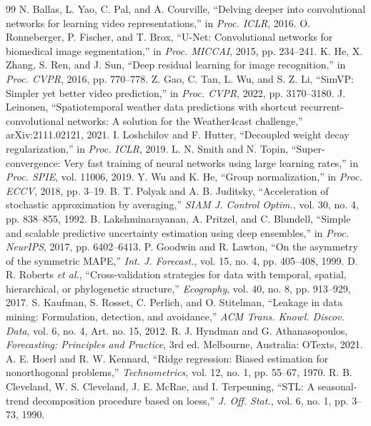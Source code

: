 \documentclass[conference]{IEEEtran}
\begin{document}
\begin{thebibliography}{99}
 N. Ballas, L. Yao, C. Pal, and A. Courville, ``Delving deeper into convolutional networks for learning video representations,'' in \emph{Proc. ICLR}, 2016.
 O. Ronneberger, P. Fischer, and T. Brox, ``U-Net: Convolutional networks for biomedical image segmentation,'' in \emph{Proc. MICCAI}, 2015, pp. 234--241.
 K. He, X. Zhang, S. Ren, and J. Sun, ``Deep residual learning for image recognition,'' in \emph{Proc. CVPR}, 2016, pp. 770--778.
 Z. Gao, C. Tan, L. Wu, and S. Z. Li, ``SimVP: Simpler yet better video prediction,'' in \emph{Proc. CVPR}, 2022, pp. 3170--3180.
 J. Leinonen, ``Spatiotemporal weather data predictions with shortcut recurrent-convolutional networks: A solution for the Weather4cast challenge,'' arXiv:2111.02121, 2021.
 I. Loshchilov and F. Hutter, ``Decoupled weight decay regularization,'' in \emph{Proc. ICLR}, 2019.
 L. N. Smith and N. Topin, ``Super-convergence: Very fast training of neural networks using large learning rates,'' in \emph{Proc. SPIE}, vol. 11006, 2019.
 Y. Wu and K. He, ``Group normalization,'' in \emph{Proc. ECCV}, 2018, pp. 3--19.
 B. T. Polyak and A. B. Juditsky, ``Acceleration of stochastic approximation by averaging,'' \emph{SIAM J. Control Optim.}, vol. 30, no. 4, pp. 838--855, 1992.
 B. Lakshminarayanan, A. Pritzel, and C. Blundell, ``Simple and scalable predictive uncertainty estimation using deep ensembles,'' in \emph{Proc. NeurIPS}, 2017, pp. 6402--6413.
 P. Goodwin and R. Lawton, ``On the asymmetry of the symmetric MAPE,'' \emph{Int. J. Forecast.}, vol. 15, no. 4, pp. 405--408, 1999.
 D. R. Roberts \emph{et al.}, ``Cross-validation strategies for data with temporal, spatial, hierarchical, or phylogenetic structure,'' \emph{Ecography}, vol. 40, no. 8, pp. 913--929, 2017.
 S. Kaufman, S. Rosset, C. Perlich, and O. Stitelman, ``Leakage in data mining: Formulation, detection, and avoidance,'' \emph{ACM Trans. Knowl. Discov. Data}, vol. 6, no. 4, Art. no. 15, 2012.
 R. J. Hyndman and G. Athanasopoulos, \emph{Forecasting: Principles and Practice}, 3rd ed. Melbourne, Australia: OTexts, 2021.
 A. E. Hoerl and R. W. Kennard, ``Ridge regression: Biased estimation for nonorthogonal problems,'' \emph{Technometrics}, vol. 12, no. 1, pp. 55--67, 1970.
 R. B. Cleveland, W. S. Cleveland, J. E. McRae, and I. Terpenning, ``STL: A seasonal-trend decomposition procedure based on loess,'' \emph{J. Off. Stat.}, vol. 6, no. 1, pp. 3--73, 1990.

\end{thebibliography}
\end{document}
